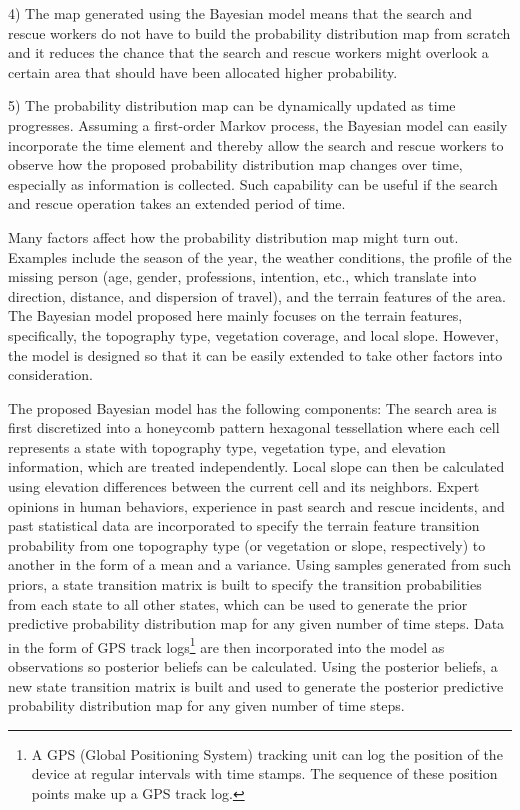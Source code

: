 4) The map generated using the Bayesian model means that the search and rescue workers do not have to build the probability distribution map from scratch and it reduces the chance that the search and rescue workers might overlook a certain area that should have been allocated higher probability.

5) The probability distribution map can be dynamically updated as time progresses. Assuming a first-order Markov process, the Bayesian model can easily incorporate the time element and thereby allow the search and rescue workers to observe how the proposed probability distribution map changes over time, especially as information is collected. Such capability can be useful if the search and rescue operation takes an extended period of time.

Many factors affect how the probability distribution map might turn out. Examples include the season of the year, the weather conditions, the profile of the missing person (age, gender, professions, intention, etc., which translate into direction, distance, and dispersion of travel), and the terrain features of the area. The Bayesian model proposed here mainly focuses on the terrain features, specifically, the topography type, vegetation coverage, and local slope. However, the model is designed so that it can be easily extended to take other factors into consideration.

The proposed Bayesian model has the following components: The search area is first discretized into a honeycomb pattern hexagonal tessellation where each cell represents a state with topography type, vegetation type, and elevation information, which are treated independently. Local slope can then be calculated using elevation differences between the current cell and its neighbors. Expert opinions in human behaviors, experience in past search and rescue incidents, and past statistical data are incorporated to specify the terrain feature transition probability from one topography type (or vegetation or slope, respectively) to another in the form of a mean and a variance. Using samples generated from such priors, a state transition matrix is built to specify the transition probabilities from each state to all other states, which can be used to generate the prior predictive probability distribution map for any given number of time steps. Data in the form of GPS track logs\footnote{A GPS (Global Positioning System) tracking unit can log the position of the device at regular intervals with time stamps. The sequence of these position points make up a GPS track log.} are then incorporated into the model as observations so posterior beliefs can be calculated. Using the posterior beliefs, a new state transition matrix is built and used to generate the posterior predictive probability distribution map for any given number of time steps.

